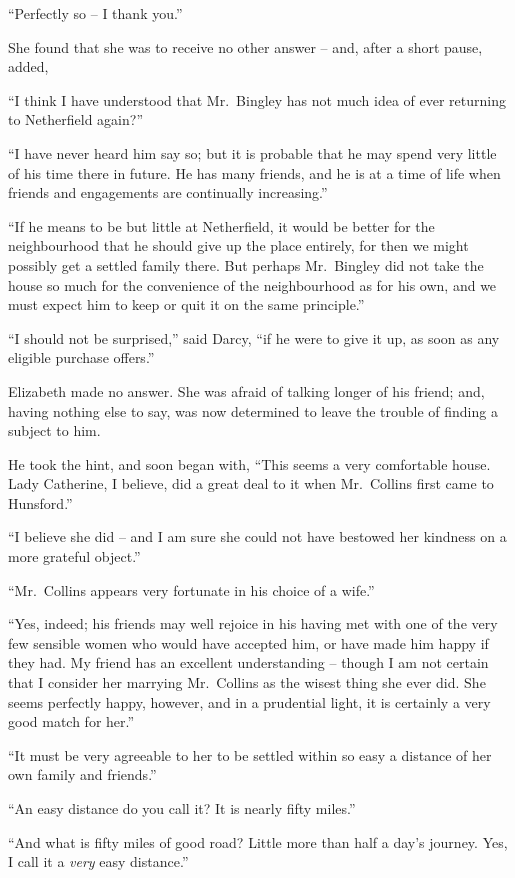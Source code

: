 “Perfectly so -- I thank you.”

She found that she was to receive no other answer -- and,
after a short pause, added,

“I think I have understood that Mr.\ Bingley has not
much idea of ever returning to Netherfield again?”

“I have never heard him say so; but it is probable
that he may spend very little of his time there in future.
He has many friends, and he is at a time of life when
friends and engagements are continually increasing.”

“If he means to be but little at Netherfield, it would
be better for the neighbourhood that he should give up
the place entirely, for then we might possibly get a
settled family there. But perhaps Mr.\ Bingley did not
take the house so much for the convenience of the neighbourhood
as for his own, and we must expect him to keep
or quit it on the same principle.”

“I should not be surprised,” said Darcy, “if he were
to give it up, as soon as any eligible purchase offers.”

Elizabeth made no answer. She was afraid of talking
longer of his friend; and, having nothing else to say,
was now determined to leave the trouble of finding a
subject to him.

He took the hint, and soon began with, “This seems
a very comfortable house. Lady Catherine, I believe,
did a great deal to it when Mr.\ Collins first came to
Hunsford.”

“I believe she did -- and I am sure she could not have
bestowed her kindness on a more grateful object.”

“Mr.\ Collins appears very fortunate in his choice of
a wife.”

“Yes, indeed; his friends may well rejoice in his
having met with one of the very few sensible women
who would have accepted him, or have made him happy
if they had. My friend has an excellent understanding -- though
I am not certain that I consider her marrying
Mr.\ Collins as the wisest thing she ever did. She seems
perfectly happy, however, and in a prudential light, it is
certainly a very good match for her.”

“It must be very agreeable to her to be settled within
so easy a distance of her own family and friends.”

“An easy distance do you call it? It is nearly fifty
miles.”

“And what is fifty miles of good road? Little more
than half a day’s journey. Yes, I call it a \textit{very} easy
distance.”

